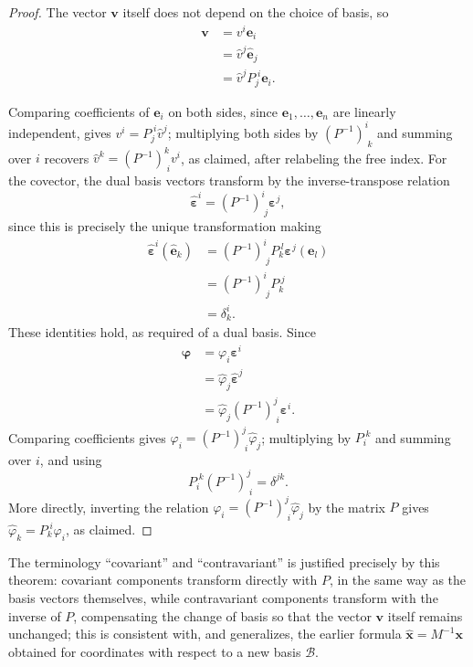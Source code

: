 \begin{proof}
The vector $\mathbf{v}$ itself does not depend on the choice of basis, so
\[
\begin{aligned}
\mathbf{v} &= v^i\mathbf{e}_i \\[0.5em]
&= \hat{v}^j\hat{\mathbf{e}}_j \\[0.5em]
&= \hat{v}^j P_j^{\;i}\mathbf{e}_i.
\end{aligned}
\]

Comparing coefficients of $\mathbf{e}_i$ on both sides, since $\mathbf{e}_1,\dots,\mathbf{e}_n$ are linearly independent, gives $v^i = P_j^{\;i}\hat{v}^j$; multiplying both sides by $(P^{-1})^i_{\;k}$ and summing over $i$ recovers $\hat{v}^k = (P^{-1})^k_{\;i}v^i$, as claimed, after relabeling the free index. For the covector, the dual basis vectors transform by the inverse-transpose relation
\[
\hat{\boldsymbol{\varepsilon}}^i = (P^{-1})^i_{\;j}\boldsymbol{\varepsilon}^j,
\] since this is precisely the unique transformation making
\[
\begin{aligned}
\hat{\boldsymbol{\varepsilon}}^i(\hat{\mathbf{e}}_k) &= (P^{-1})^i_{\;j}P_k^{\;l}\boldsymbol{\varepsilon}^j(\mathbf{e}_l) \\[0.5em]
&= (P^{-1})^i_{\;j}P_k^{\;j} \\[0.5em]
&= \delta^i_k.
\end{aligned}
\]
These identities hold, as required of a dual basis. Since
\[
\begin{aligned}
\boldsymbol{\varphi} &= \varphi_i\boldsymbol{\varepsilon}^i \\[0.5em]
&= \hat\varphi_j\hat{\boldsymbol{\varepsilon}}^j \\[0.5em]
&= \hat\varphi_j (P^{-1})^j_{\;i}\boldsymbol{\varepsilon}^i.
\end{aligned}
\]
Comparing coefficients gives $\varphi_i = (P^{-1})^j_{\;i}\hat\varphi_j$; multiplying by $P_i^{\;k}$ and summing over $i$, and using
\[
P_i^{\;k}(P^{-1})^j_{\;i} = \delta^{jk}.
\]
More directly, inverting the relation $\varphi_i = (P^{-1})^j_{\;i}\hat\varphi_j$ by the matrix $P$ gives $\hat\varphi_k = P_k^{\;i}\varphi_i$, as claimed.
\end{proof}

The terminology ``covariant'' and ``contravariant'' is justified precisely by this theorem: covariant components transform directly with $P$, in the same way as the basis vectors themselves, while contravariant components transform with the inverse of $P$, compensating the change of basis so that the vector $\mathbf{v}$ itself remains unchanged; this is consistent with, and generalizes, the earlier formula $\hat{\mathbf{x}} = M^{-1}\mathbf{x}$ obtained for coordinates with respect to a new basis $\mathcal{B}$.

